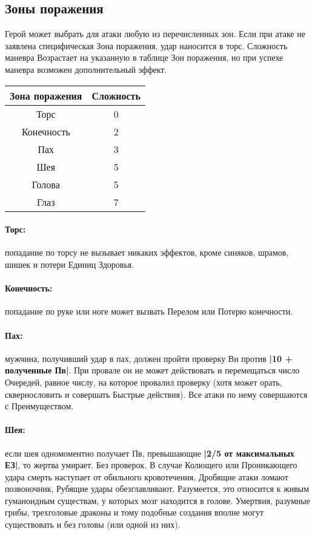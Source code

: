 \subsection{Зоны поражения}
Герой может выбрать для атаки любую из перечисленных зон. Если при атаке не заявлена специфическая Зона поражения, удар наносится в торс.
\newline Сложность маневра Возрастает на указанную в таблице Зон поражения, но при успехе маневра возможен дополнительный эффект.
\begin{center}
\begin{tabular}{|c|c|}
\hline
Зона поражения & Сложность \\ \hline
Торс & 0 \\ \hline
Конечность & 2 \\ \hline
Пах & 3 \\ \hline
Шея & 5 \\ \hline
Голова & 5 \\ \hline
Глаз & 7 \\ \hline
\end{tabular}
\end{center}
\paragraph{Торс:} попадание по торсу не вызывает никаких эффектов, кроме синяков, шрамов, шишек и потери Единиц Здоровья.
\paragraph{Конечность:} попадание по руке или ноге может вызвать Перелом или Потерю конечности.
\paragraph{Пах:} мужчина, получивший удар в пах, должен пройти проверку Вн против \textbf{|10 + полученные Пв|}. При провале он не может действовать и перемещаться число Очередей, равное числу, на которое провалил проверку (хотя может орать, сквернословить и совершать Быстрые действия). Все атаки по нему совершаются с Преимуществом.
\paragraph{Шея:} если шея одномоментно получает Пв, превышающие \textbf{|2/5 от максимальных ЕЗ|}, то жертва умирает. Без проверок. В случае Колющего или Проникающего удара смерть наступает от обильного кровотечения, Дробящие атаки ломают позвоночник, Рубящие удары обезглавливают.
\newline
Разумеется, это относится к живым гуманоидным существам, у которых мозг находится в голове. Умертвия, разумные грибы, трехголовые драконы и тому подобные создания вполне могут существовать и без головы (или одной из них).
